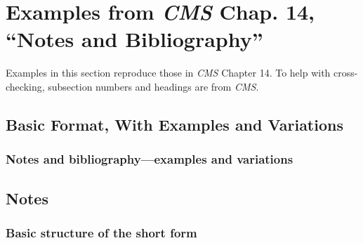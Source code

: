 \documentclass[11pt,letterpaper,oneside]{article}
\begin{document}
\section{Examples from \emph{CMS} Chap. 14, ``Notes and
Bibliography''}
\label{notes}

Examples in this section reproduce those in \textit{CMS} Chapter 14.
To help with cross-checking, subsection numbers and headings are from
\textit{CMS}.

\subsection{Basic Format, With Examples and Variations}
\setcounter{subsection}{14}

\setcounter{subsubsection}{22}
\subsubsection{Notes and bibliography—examples and variations}
\label{14.23}

\begin{citebib}
\item \cite[87-88]{strayed2012}
\item \cite[261, 265]{strayed2012}
\item \cite[32]{daum2015}
\item \cite[134--35]{daum2015}
\item \cite[188]{grazer2015}
\item \cite[190]{grazer2015}
\item \cite[242--55]{garcia1988}
\item \cite[33]{garcia1988}
\item \cite[310]{gould1984a}
\item \cite[309]{gould1984a}
\item \cite[484--85]{bagley2015}
\item \cite[501]{bagley2015}
\item \cite[311]{liu2015}
\item \cite[312]{liu2015}
\end{citebib}

\setcounter{subsection}{1}
\subsection{Notes}
\setcounter{subsection}{14}

\setcounter{subsubsection}{29}
\subsubsection{Basic structure of the short form}
\label{14.30}
\end{document}
